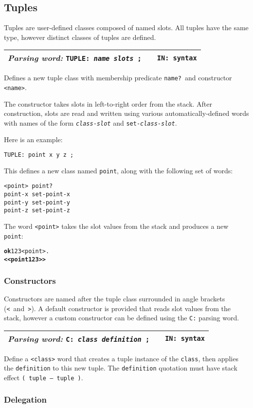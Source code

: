 \documentclass{report}
\newcommand{\parsingword}[3]{\index{#1}
\emph{Parsing word:} \texttt{#2} &&\texttt{IN: #3}}
\newcommand{\wordtable}[1]{

\begin{tabularx}{12cm}[t]{lXr}
\hline
#1\\
\hline
\end{tabularx}

}
\begin{document}
\subsection{Tuples}
\tupleglos

Tuples are user-defined classes composed of named slots. All tuples have the same type, however distinct classes of tuples are defined.
\wordtable{
\parsingword{TUPLE:}{TUPLE: \emph{name} \emph{slots} ;}{syntax}
}
Defines a new tuple class with membership predicate \texttt{name?}~and constructor \texttt{<name>}.

The constructor takes slots in left-to-right order from the stack. After construction, slots are read and written using various automatically-defined words with names of the
form \texttt{\emph{class}-\emph{slot}} and \texttt{set-\emph{class}-\emph{slot}}.

Here is an example:
\begin{verbatim}
TUPLE: point x y z ;
\end{verbatim}
This defines a new class named \texttt{point}, along with the
following set of words:
\begin{verbatim}
<point> point?
point-x set-point-x
point-y set-point-y
point-z set-point-z
\end{verbatim}
The word \texttt{<point>} takes the slot values from the stack and
produces a new \texttt{point}:
\begin{alltt}
\textbf{ok} 1 2 3 <point> .
\textbf{<< point 1 2 3 >>}
\end{alltt}

\subsubsection{Constructors}

Constructors are named after the tuple class surrounded in angle
brackets (\texttt{<}~and~\texttt{>}). A default constructor is provided
that reads slot values from the stack, however a custom constructor can
be defined using the \texttt{C:} parsing word.
\wordtable{
\parsingword{C:}{C: \emph{class} \emph{definition} ;}{syntax}
}
Define a \texttt{<class>} word that creates a tuple instance of the \texttt{class}, then applies the \texttt{definition} to this new tuple. The \texttt{definition} quotation must have stack effect \texttt{( tuple -- tuple )}.

\subsubsection{Delegation}
\end{document}
